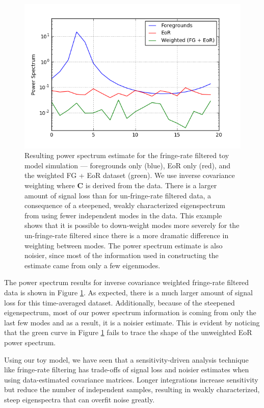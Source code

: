 \documentclass[preprint2,numberedappendix,tighten]{aastex6}  %
\begin{document}
\begin{figure}
	\centering
	\includegraphics[trim={0.3cm 0.3cm 0.3cm 0.3cm},clip,width=\columnwidth]{plots/toy_sigloss7.png}
	\caption{Resulting power spectrum estimate for the fringe-rate filtered toy model simulation --- foregrounds only (blue), EoR only (red), and the weighted FG + EoR dataset (green). We use inverse covariance weighting where $\textbf{C}$ is derived from the data. There is a larger amount of signal loss than for un-fringe-rate filtered data, a consequence of a steepened, weakly characterized eigenspectrum from using fewer independent modes in the data. This example shows that it is possible to down-weight modes more severely for the un-fringe-rate filtered since there is a more dramatic difference in weighting between modes. The power spectrum estimate is also noisier, since most of the information used in constructing the estimate came from only a few eigenmodes.}
	\label{fig:toy_sigloss7}
\end{figure}

The power spectrum results for inverse covariance weighted fringe-rate filtered data is shown in Figure \ref{fig:toy_sigloss7}. As expected, there is a much larger amount of signal loss for this time-averaged dataset. Additionally, because of the steepened eigenspectrum, most of our power spectrum information is coming from only the last few modes and as a result, it is a noisier estimate. This is evident by noticing that the green curve in Figure \ref{fig:toy_sigloss7} fails to trace the shape of the unweighted EoR power spectrum.

Using our toy model, we have seen that a sensitivity-driven analysis technique like fringe-rate filtering has trade-offs of signal loss and noisier estimates when using data-estimated covariance matrices. Longer integrations increase sensitivity but reduce the number of independent samples, resulting in weakly characterized, steep eigenspectra that can overfit noise greatly.
\end{document}
